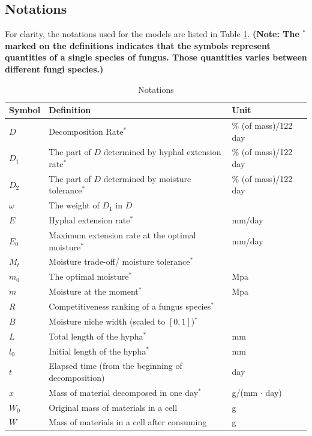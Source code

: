 \documentclass[a4paper,12pt]{article}
\begin{document}
\subsection{Notations}
For clarity, the notations used for the models are listed in Table \ref{notation}. \textbf{(Note: The $^*$ marked on the definitions indicates that the symbols represent quantities of a single species of fungus. Those quantities varies between different fungi species.)}
\begin{table}[H]
	\centering
	\caption{Notations}
	\begin{tabular}{lll}
	\midrule
	Symbol & Definition & Unit\\
	\hline
	$D$ & Decomposition Rate$^*$ & \% (of mass)/122 day \\
	$D_{1}$ & The part of $D$ determined by hyphal extension rate$^*$ & \% (of mass)/122 day\\
	$D_{2}$ & The part of $D$ determined by moisture tolerance$^*$ & \% (of mass)/122 day\\
	$\omega$ & The weight of $D_1$ in $D$ & \\
	$E$ & Hyphal extension rate$^*$ & mm/day \\
	$E_{0}$ & Maximum extension rate at the optimal moisture$^*$ & mm/day\\ 
	$M_{t}$ & Moisture trade-off/ moisture tolerance$^*$ &  \\ 
	$m_{0}$ & The optimal moisture$^*$ & Mpa \\
	$m$ & Moisture at the moment$^*$ & Mpa \\
	$R$ & Competitiveness ranking of a fungus species$^*$ & \\ 
	$B$ & Moisture niche width (scaled to $[0,1]$)$^*$ & \\ 
	$L$ & Total length of the hypha$^*$ & mm\\ 
	$l_0$ & Initial length of the hypha$^*$ & mm \\ 
	$t$ & Elapsed time (from the beginning of decomposition) & day\\
	$x$ & Mass of material decomposed in one day$^*$ & g/(mm $\cdot$ day) \\
	$W_0$ & Original mass of materials in a cell & g \\
	$W$ & Mass of materials in a cell after consuming & g \\
	\bottomrule
	\end{tabular}
	\label{notation}
   \end{table}
\end{document}
